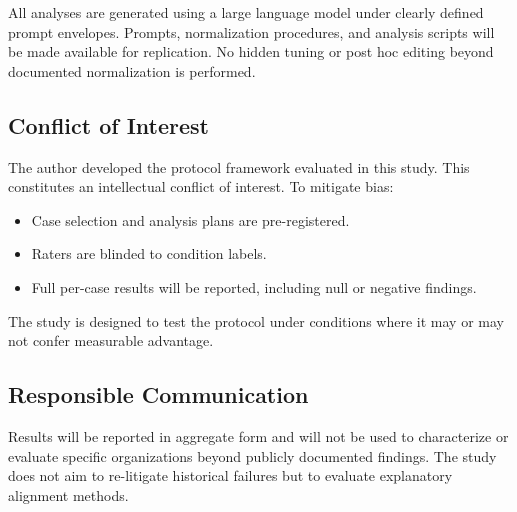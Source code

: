 All analyses are generated using a large language model under clearly defined prompt envelopes. Prompts, normalization procedures, and analysis scripts will be made available for replication. No hidden tuning or post hoc editing beyond documented normalization is performed.

\subsection{Conflict of Interest}

The author developed the protocol framework evaluated in this study. This constitutes an intellectual conflict of interest. To mitigate bias:

\begin{itemize}
    \item Case selection and analysis plans are pre-registered.
    \item Raters are blinded to condition labels.
    \item Full per-case results will be reported, including null or negative findings.
\end{itemize}

The study is designed to test the protocol under conditions where it may or may not confer measurable advantage.

\subsection{Responsible Communication}

Results will be reported in aggregate form and will not be used to characterize or evaluate specific organizations beyond publicly documented findings. The study does not aim to re-litigate historical failures but to evaluate explanatory alignment methods.
